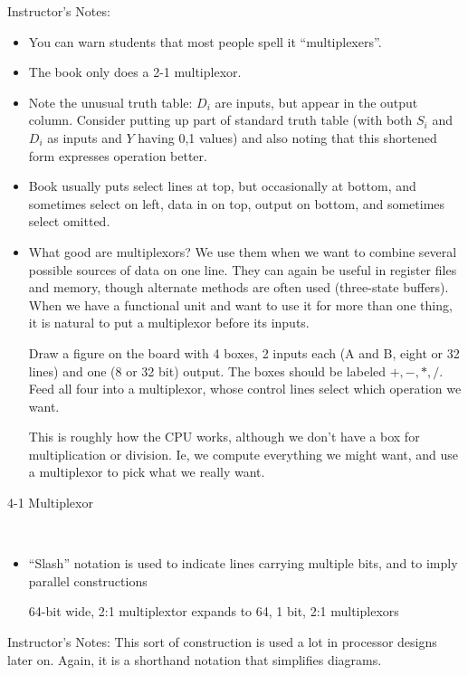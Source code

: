 \BNotes\ifnum{}
\begin{frame}[fragile]
Instructor's Notes:
\begin{itemize}
\item You can warn students that most people spell it
``multiplexers''.
\item The book only does a 2-1 multiplexor.
\item Note the unusual truth table: $D_i$ are inputs, but appear in the
	output column.  Consider putting up part of standard truth table
	(with both $S_i$ and $D_i$ as inputs and $Y$ having 0,1 values)
	and also noting that this shortened form expresses operation
	better.
\item Book usually puts select lines at top, but occasionally at bottom,
	and sometimes select on left, data in on top, output on
	bottom, and sometimes select omitted.

 \item What good are multiplexors? We use them when we want to combine
several possible sources of data on one line.  They can again be useful
in register files and memory, though alternate methods are often
used (three-state buffers). When we have a functional unit and want to
use it for more than one thing, it is natural to put a multiplexor
before its inputs.

Draw a figure on the board with 4 boxes, 2 inputs each (A and B, eight
	or 32 lines) and one (8 or 32 bit) output.  The boxes should be
	labeled $+,-,*,/$.  Feed all four into a multiplexor, whose
	control lines select which operation we want.  

	This is roughly how the CPU works, although we don't have a box
	for multiplication or division.  Ie, we compute everything we
	might want, and use a multiplexor to pick what we really want.

\end{itemize}
\end{frame}
\fi\ENotes

\begin{frame}
	\centerline{4-1 Multiplexor}
\BNotes\ifnum{}
~
\fi\ENotes
\end{frame}

\begin{frame}[fragile]
\begin{itemize}
	\item ``Slash'' notation is used to indicate lines carrying
	multiple bits, and to imply parallel constructions


64-bit wide, 2:1 multiplextor expands to 64, 1 bit, 2:1 multiplexors
\end{itemize}
\end{frame}
\BNotes\ifnum{}
\begin{frame}[fragile]
Instructor's Notes:
This sort of construction is used a lot in processor designs later
on. Again, it is a shorthand notation that simplifies diagrams.
\end{frame}
\fi\ENotes

